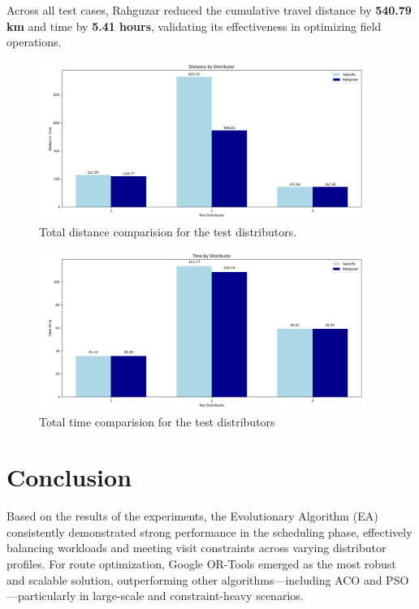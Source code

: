 Across all test cases, Rahguzar reduced the cumulative travel distance by \textbf{540.79 km} and time by \textbf{5.41 hours}, validating its effectiveness in optimizing field operations.

\begin{figure}[H]
    \centering
    \includegraphics[width=0.95\textwidth]{images/distance_rahgyzar_salesflo_comp}
    \caption{Total distance comparision for the test distributors.}
    \label{fig:results_distance_comparision}
\end{figure}


\begin{figure}[H]
    \centering
    \includegraphics[width=0.95\textwidth]{images/time_rahgyzar_salesflo_comp}
    \caption{Total time comparision for the test distributors}
    \label{fig:results_time_comparision}
\end{figure}

\section{Conclusion}
Based on the results of the experiments, the Evolutionary Algorithm (EA) consistently demonstrated strong performance in the scheduling phase, effectively balancing workloads and meeting visit constraints across varying distributor profiles. For route optimization, Google OR-Tools emerged as the most robust and scalable solution, outperforming other algorithms—including ACO and PSO—particularly in large-scale and constraint-heavy scenarios.

